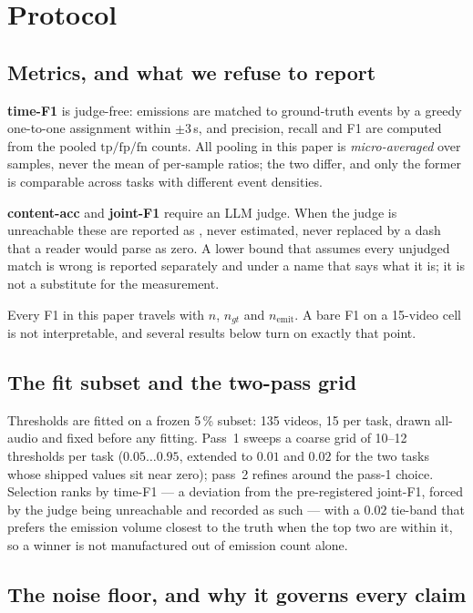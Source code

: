\section{Protocol}
\label{sec:protocol}

\subsection{Metrics, and what we refuse to report}

\textbf{time-F1} is judge-free: emissions are matched to ground-truth events by a
greedy one-to-one assignment within $\pm 3$\,s, and precision, recall and F1 are
computed from the pooled $\mathrm{tp}/\mathrm{fp}/\mathrm{fn}$ counts. All pooling
in this paper is \emph{micro-averaged} over samples, never the mean of per-sample
ratios; the two differ, and only the former is comparable across tasks with
different event densities.

\textbf{content-acc} and \textbf{joint-F1} require an LLM judge. When the judge is
unreachable these are reported as \WITHHELD, never estimated, never replaced by a
dash that a reader would parse as zero. A lower bound that assumes every unjudged
match is wrong is reported separately and under a name that says what it is; it is
not a substitute for the measurement.

Every F1 in this paper travels with $n$, $n_{gt}$ and $n_{\mathrm{emit}}$. A bare
F1 on a 15-video cell is not interpretable, and several results below turn on
exactly that point.

\subsection{The fit subset and the two-pass grid}

Thresholds are fitted on a frozen 5\,\% subset: 135 videos, 15 per task, drawn
all-audio and fixed before any fitting. Pass~1 sweeps a coarse grid of 10--12
thresholds per task ($0.05 \ldots 0.95$, extended to $0.01$ and $0.02$ for the two
tasks whose shipped values sit near zero); pass~2 refines around the pass-1 choice.
Selection ranks by time-F1 --- a deviation from the pre-registered joint-F1,
forced by the judge being unreachable and recorded as such --- with a $0.02$
tie-band that prefers the emission volume closest to the truth when the top two
are within it, so a winner is not manufactured out of emission count alone.

\subsection{The noise floor, and why it governs every claim}

